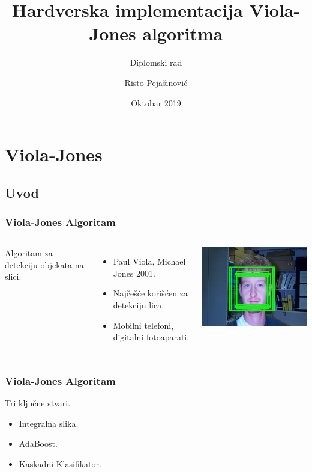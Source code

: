 \documentclass{beamer}
\title[] %
{Hardverska implementacija Viola-Jones algoritma}
\subtitle{Diplomski rad}
\author[Risto Pejašinović]
{Risto Pejašinović}
\institute[FTN] %
{
  Fakultet Tehničkih Nauka,
  Univerzitet u Novom Sadu
}
\date[Oktobar 2019] %
{Oktobar 2019}
\begin{document}
\frame{\titlepage}


\section{Viola-Jones}

\subsection{Uvod}
\begin{frame}
  \frametitle{Viola-Jones Algoritam}
  \begin{columns}[onlytextwidth,T]
    \column{\dimexpr\linewidth-35mm-2mm}
    Algoritam za detekciju objekata na slici.
    \begin{itemize}
    \item Paul Viola, Michael Jones 2001.
    \item<1-> Najčešće korišćen za detekciju lica.
    \item<1-> Mobilni telefoni, digitalni fotoaparati.
    \end{itemize}

    \column{50mm}
    \begin{overprint}
      \includegraphics[width=0.7\linewidth]{../images/rotation_variance}
    \end{overprint}
  \end{columns}
\end{frame}

\begin{frame}
  \frametitle{Viola-Jones Algoritam}
  Tri ključne stvari.
  \begin{itemize}
  \item<1-> Integralna slika.
  \item<1-> AdaBoost.
  \item<1-> Kaskadni Klasifikator.
  \end{itemize}
\end{frame}
\end{document}

